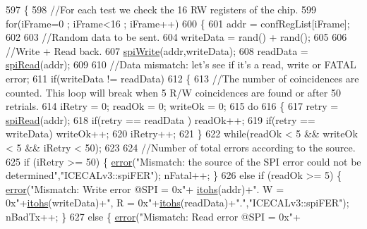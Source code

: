 \begin{DoxyCode}
597     \{
598         \textcolor{comment}{//For each test we check the 16 RW registers of the chip.}
599         \textcolor{keywordflow}{for}(iFrame=0 ; iFrame<16 ; iFrame++)
600         \{
601             addr = confRegList[iFrame];
602 
603             \textcolor{comment}{//Random data to be sent.}
604             writeData = rand() + rand();
605 
606             \textcolor{comment}{//Write + Read back.    }
607             \hyperlink{classICECALv3_aef00f02801dea4bda2093c930501dcdd}{spiWrite}(addr,writeData);
608             readData = \hyperlink{classICECALv3_aaabb9543482c4141fa89b4b8410164e0}{spiRead}(addr);    
609 
610             \textcolor{comment}{//Data mismatch: let's see if it's a read, write or FATAL error;}
611             \textcolor{keywordflow}{if}(writeData != readData)
612             \{
613                 \textcolor{comment}{//The number of coincidences are counted. This loop will break when 5 R/W coincidences are
       found or after 50 retrials.}
614                 iRetry = 0;     readOk = 0;         writeOk = 0;
615                 \textcolor{keywordflow}{do}
616                 \{
617                     retry = \hyperlink{classICECALv3_aaabb9543482c4141fa89b4b8410164e0}{spiRead}(addr);
618                     \textcolor{keywordflow}{if}(retry == readData )  readOk++;
619                     \textcolor{keywordflow}{if}(retry == writeData) writeOk++;
620                     iRetry++;
621                 \}
622                 \textcolor{keywordflow}{while}(readOk < 5 && writeOk < 5 && iRetry < 50);
623 
624                 \textcolor{comment}{//Number of total errors according to the source.}
625                 \textcolor{keywordflow}{if}          (iRetry >= 50) \{    \hyperlink{classObject_a204a95f57818c0f811933917a30eff45}{error}(\textcolor{stringliteral}{"Mismatch: the source of the SPI error could not
       be determined"},\textcolor{stringliteral}{"ICECALv3::spiFER"});     nFatal++;   \}
626                 \textcolor{keywordflow}{else} \textcolor{keywordflow}{if} (readOk >= 5)    \{  \hyperlink{classObject_a204a95f57818c0f811933917a30eff45}{error}(\textcolor{stringliteral}{"Mismatch: Write error @SPI = 0x"}+
      \hyperlink{classICECALv3_a04b02e583f191bfce34d05132cd23834}{itohs}(addr)+\textcolor{stringliteral}{". W = 0x"}+\hyperlink{classICECALv3_a04b02e583f191bfce34d05132cd23834}{itohs}(writeData)+\textcolor{stringliteral}{", R = 0x"}+\hyperlink{classICECALv3_a04b02e583f191bfce34d05132cd23834}{itohs}(readData)+\textcolor{stringliteral}{"."},\textcolor{stringliteral}{"ICECALv3::spiFER"});  
      nBadTx++;    \}
627                 \textcolor{keywordflow}{else}                                     \{  \hyperlink{classObject_a204a95f57818c0f811933917a30eff45}{error}(\textcolor{stringliteral}{"Mismatch: Read error @SPI = 0x"}+

\end{DoxyCode}
